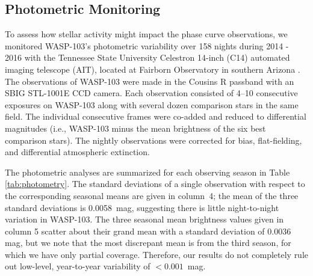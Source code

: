 \documentclass[twocolumn, trackchanges]{aastex61}
\begin{document}

\subsection{Photometric Monitoring}
To assess how stellar activity might impact the phase curve observations, we monitored WASP-103's photometric variability over 158 nights during 2014 - 2016 with the Tennessee State University Celestron 14-inch (C14) automated imaging telescope (AIT), located at Fairborn Observatory in southern Arizona \citep[][]{henry99}.  The observations of WASP-103 were made in the Cousins R passband with an SBIG STL-1001E CCD camera.  Each observation consisted of 4--10 consecutive exposures on WASP-103 along with several dozen comparison stars in the same field. The individual consecutive frames were co-added and reduced to differential magnitudes (i.e., WASP-103 minus the mean brightness of the six best comparison stars). The nightly observations were corrected for bias, flat-fielding, and differential atmospheric extinction.  

The photometric analyses are summarized for each observing season in Table\,\ref{tab:photometry}.  The standard deviations of a single observation with respect to the corresponding seasonal means are given in column~4; the mean of the three standard deviations is 0.0058~mag, suggesting there is little night-to-night variation in WASP-103.  The three seasonal mean brightness values given in column 5 scatter about their grand mean with a standard deviation of 0.0036 mag, but we note that the most discrepant mean is from the third season, for which we have only partial coverage. Therefore, our results do not completely rule out low-level, year-to-year variability of $<0.001$~mag.
\end{document}
